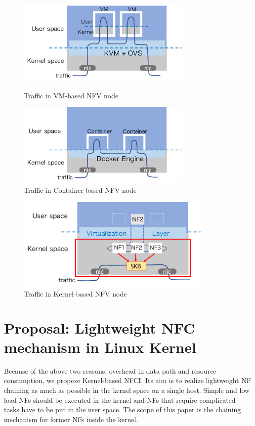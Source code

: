 \begin{figure}[t]
	\begin{minipage}{0.5\hsize}
		\begin{center}
			\includegraphics[width=85mm]{pics/KVM+OVS.pdf}
		\end{center}
		\caption{Traffic in VM-based NFV node}
		\label{fig: kvm+ovs}
	\end{minipage}	
	\begin{minipage}{0.5\hsize}
		\begin{center}
			\includegraphics[width=85mm]{pics/Docker.pdf}
		\end{center}
		\caption{Traffic in Container-based NFV node}
		\label{fig: docker}
	\end{minipage}	
\end{figure}

\begin{figure}
	\centering
	\includegraphics[width=95mm]{pics/path_kernel.pdf}
	\caption{Traffic in Kernel-based NFV node}
	\label{fig: path_kernel}
\end{figure}

\section{Proposal: Lightweight NFC mechanism in Linux Kernel}
Because of the above two reasons, overhead in data path and resource consumption, we propose Kernel-based NFCI. Its aim is to realize lightweight NF chaining as much as possible in the kernel space on a single host. Simple and low load NFs should be executed in the kernel and NFs that require complicated tasks have to be put in the user space. The scope of this paper is the chaining mechanism for former NFs inside the kernel.

